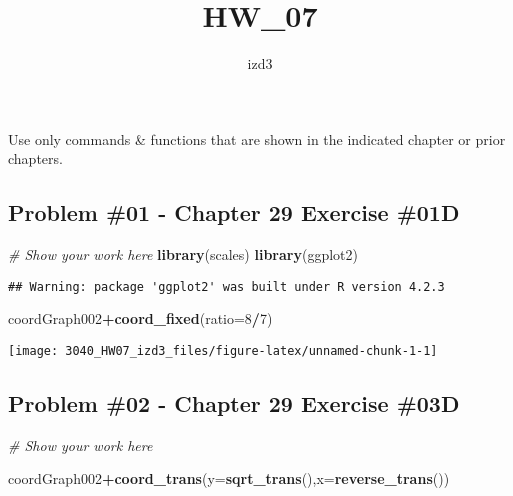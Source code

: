 \documentclass[
]{article}
\title{HW\_07}
\author{izd3}
\date{}
\newenvironment{Shaded}{\begin{snugshade}}{\end{snugshade}}
\newcommand{\AttributeTok}[1]{\textcolor[rgb]{0.13,0.29,0.53}{#1}}
\newcommand{\CommentTok}[1]{\textcolor[rgb]{0.56,0.35,0.01}{\textit{#1}}}
\newcommand{\DecValTok}[1]{\textcolor[rgb]{0.00,0.00,0.81}{#1}}
\newcommand{\FunctionTok}[1]{\textcolor[rgb]{0.13,0.29,0.53}{\textbf{#1}}}
\newcommand{\NormalTok}[1]{#1}
\newcommand{\SpecialCharTok}[1]{\textcolor[rgb]{0.81,0.36,0.00}{\textbf{#1}}}
\begin{document}
\maketitle

Use only commands \& functions that are shown in the indicated chapter
or prior chapters.

\newpage

\hypertarget{problem-01---chapter-29-exercise-01d}{%
\subsection{Problem \#01 - Chapter 29 Exercise
\#01D}\label{problem-01---chapter-29-exercise-01d}}

\begin{Shaded}
\begin{Highlighting}[]
\CommentTok{\# Show your work here}
\FunctionTok{library}\NormalTok{(scales)}
\FunctionTok{library}\NormalTok{(ggplot2)}
\end{Highlighting}
\end{Shaded}

\begin{verbatim}
## Warning: package 'ggplot2' was built under R version 4.2.3
\end{verbatim}

\begin{Shaded}
\begin{Highlighting}[]
\NormalTok{coordGraph002}\SpecialCharTok{+}\FunctionTok{coord\_fixed}\NormalTok{(}\AttributeTok{ratio=}\DecValTok{8}\SpecialCharTok{/}\DecValTok{7}\NormalTok{)}
\end{Highlighting}
\end{Shaded}

\texttt{[image: 3040\_HW07\_izd3\_files/figure-latex/unnamed-chunk-1-1]}

\newpage

\hypertarget{problem-02---chapter-29-exercise-03d}{%
\subsection{Problem \#02 - Chapter 29 Exercise
\#03D}\label{problem-02---chapter-29-exercise-03d}}

\begin{Shaded}
\begin{Highlighting}[]
\CommentTok{\# Show your work here}

\NormalTok{coordGraph002}\SpecialCharTok{+}\FunctionTok{coord\_trans}\NormalTok{(}\AttributeTok{y=}\FunctionTok{sqrt\_trans}\NormalTok{(),}\AttributeTok{x=}\FunctionTok{reverse\_trans}\NormalTok{())}
\end{Highlighting}
\end{Shaded}
\end{document}
